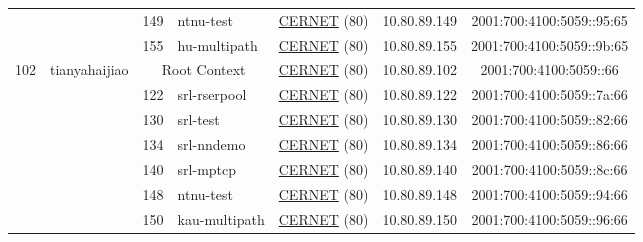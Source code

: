 \begin{small}
\begin{center}
\begin{longtable}{|c|c|c|c|c|c|c|c|}
  &  & \tiny{149} & \multicolumn{1}{|l|}{\tiny{ntnu-test}} & \multicolumn{2}{|c|}{\tiny{\href{http://www.cernet.edu.cn}{CERNET} (80)}} & \tiny{10.80.89.149} & \tiny{2001:700:4100:5059::95:65} \\* \cline{3-3}\cline{4-4}\cline{5-5}\cline{6-6}\cline{7-7}\cline{8-8}
  &  & \tiny{155} & \multicolumn{1}{|l|}{\tiny{hu-multipath}} & \multicolumn{2}{|c|}{\tiny{\href{http://www.cernet.edu.cn}{CERNET} (80)}} & \tiny{10.80.89.155} & \tiny{2001:700:4100:5059::9b:65} \\ \hline
 \multirow{9}{*}{\tiny{102}} & \multicolumn{1}{|l|}{\multirow{9}{*}{\tiny{tianyahaijiao}}} & \multicolumn{2}{|c|}{\tiny{Root Context}} & \multicolumn{2}{|c|}{\tiny{\href{http://www.cernet.edu.cn}{CERNET} (80)}} & \tiny{10.80.89.102} & \tiny{2001:700:4100:5059::66} \\* \cline{3-3}\cline{4-4}\cline{5-5}\cline{6-6}\cline{7-7}\cline{8-8}
  &  & \tiny{122} & \multicolumn{1}{|l|}{\tiny{srl-rserpool}} & \multicolumn{2}{|c|}{\tiny{\href{http://www.cernet.edu.cn}{CERNET} (80)}} & \tiny{10.80.89.122} & \tiny{2001:700:4100:5059::7a:66} \\* \cline{3-3}\cline{4-4}\cline{5-5}\cline{6-6}\cline{7-7}\cline{8-8}
  &  & \tiny{130} & \multicolumn{1}{|l|}{\tiny{srl-test}} & \multicolumn{2}{|c|}{\tiny{\href{http://www.cernet.edu.cn}{CERNET} (80)}} & \tiny{10.80.89.130} & \tiny{2001:700:4100:5059::82:66} \\* \cline{3-3}\cline{4-4}\cline{5-5}\cline{6-6}\cline{7-7}\cline{8-8}
  &  & \tiny{134} & \multicolumn{1}{|l|}{\tiny{srl-nndemo}} & \multicolumn{2}{|c|}{\tiny{\href{http://www.cernet.edu.cn}{CERNET} (80)}} & \tiny{10.80.89.134} & \tiny{2001:700:4100:5059::86:66} \\* \cline{3-3}\cline{4-4}\cline{5-5}\cline{6-6}\cline{7-7}\cline{8-8}
  &  & \tiny{140} & \multicolumn{1}{|l|}{\tiny{srl-mptcp}} & \multicolumn{2}{|c|}{\tiny{\href{http://www.cernet.edu.cn}{CERNET} (80)}} & \tiny{10.80.89.140} & \tiny{2001:700:4100:5059::8c:66} \\* \cline{3-3}\cline{4-4}\cline{5-5}\cline{6-6}\cline{7-7}\cline{8-8}
  &  & \tiny{148} & \multicolumn{1}{|l|}{\tiny{ntnu-test}} & \multicolumn{2}{|c|}{\tiny{\href{http://www.cernet.edu.cn}{CERNET} (80)}} & \tiny{10.80.89.148} & \tiny{2001:700:4100:5059::94:66} \\* \cline{3-3}\cline{4-4}\cline{5-5}\cline{6-6}\cline{7-7}\cline{8-8}
  &  & \tiny{150} & \multicolumn{1}{|l|}{\tiny{kau-multipath}} & \multicolumn{2}{|c|}{\tiny{\href{http://www.cernet.edu.cn}{CERNET} (80)}} & \tiny{10.80.89.150} & \tiny{2001:700:4100:5059::96:66} \\* \cline{3-3}\cline{4-4}\cline{5-5}\cline{6-6}\cline{7-7}\cline{8-8}

\end{longtable}
\end{center}
\end{small}
